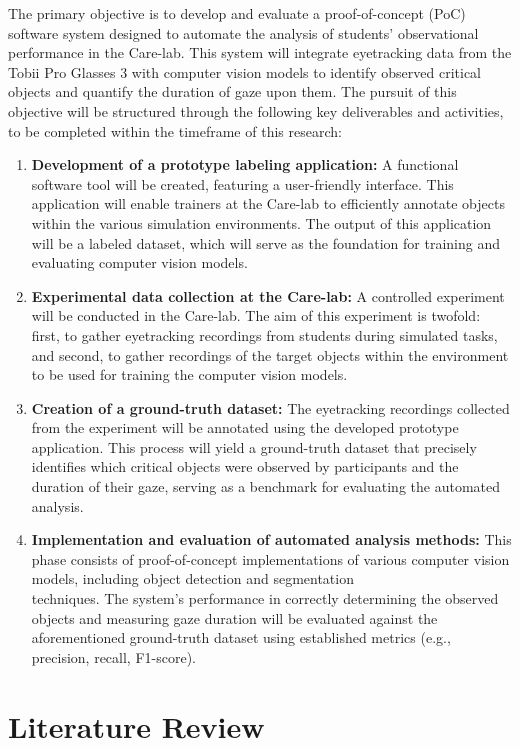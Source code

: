 \documentclass[english]{hogent-article}
\begin{document}
The primary objective is to develop and evaluate a proof-of-concept (PoC) software system designed to automate the analysis of students' observational performance in the Care-lab.
This system will integrate eyetracking data from the Tobii Pro Glasses 3 with computer vision models to identify observed critical objects and quantify the duration of gaze upon them.
The pursuit of this objective will be structured through the following key deliverables and activities, to be completed within the timeframe of this research:
\begin{enumerate}
    \item \textbf{Development of a prototype labeling application:} A functional software tool will be created, featuring a user-friendly interface.
    This application will enable trainers at the Care-lab to efficiently annotate objects\\ within the various simulation environments.
    The output of this application will be a labeled dataset, which will serve as the foundation for training and evaluating computer vision models.
    \item \textbf{Experimental data collection at the Care-lab:} A controlled experiment will be conducted in the Care-lab. 
    The aim of this experiment is twofold: first, to gather eyetracking recordings from students during simulated tasks, and second, to gather recordings of the target objects within the environment to be used for training the computer vision models.
    \item \textbf{Creation of a ground-truth dataset:} The eyetracking recordings collected from the experiment will be annotated using the developed prototype application.
    This process will yield a ground-truth dataset that precisely identifies which critical objects were observed by participants and the duration of their gaze, serving as a benchmark for evaluating the automated analysis.
    \item \textbf{Implementation and evaluation of automated analysis methods:} This phase consists of proof-of-concept implementations of various computer vision models, including object detection and segmentation\\ techniques.
    The system's performance in correctly determining the observed objects and measuring gaze duration will be evaluated against the aforementioned ground-truth dataset using established metrics (e.g., precision, recall, F1-score).
\end{enumerate}

\section{Literature Review}
\label{sec:literature-review}
\end{document}
